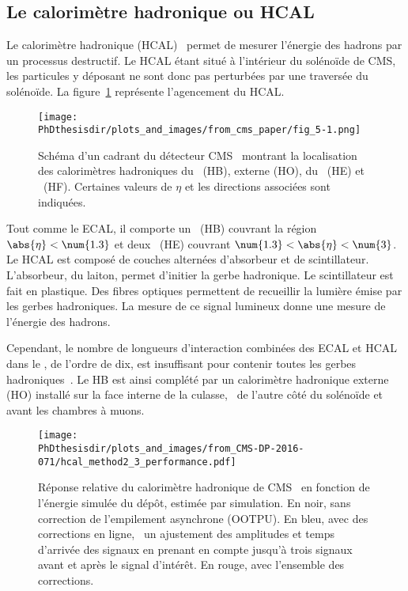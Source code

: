 \subsection{Le calorimètre hadronique ou HCAL}\label{chapter-LHC-section-CMS-subsec-HCAL}
Le calorimètre hadronique (HCAL)~\cite{cms_paper,CERN-LHCC-97-031,CMS-TDR-10} permet de mesurer l'énergie des hadrons par un processus destructif.
Le HCAL étant situé à l'intérieur du solénoïde de CMS, les particules y déposant ne sont donc pas perturbées par une traversée du solénoïde.
La figure~\ref{fig-chapter-LHC-section-CMS-subsec-HCAL-cms_paper-fig_5-1} représente l'agencement du HCAL.
\begin{figure}[b]
\centering
\texttt{[image: \\PhDthesisdir/plots\_and\_images/from\_cms\_paper/fig\_5-1.png]}
\caption[Schéma du calorimètre hadronique de CMS.]{Schéma d'un cadrant du détecteur CMS~\cite{cms_paper} montrant la localisation des calorimètres hadroniques du \CMSbarrel\ (HB), externe (HO), du \CMSendcap\ (HE) et \CMSforward\ (HF). Certaines valeurs de $\eta$ et les directions associées sont indiquées.}
\label{fig-chapter-LHC-section-CMS-subsec-HCAL-cms_paper-fig_5-1}
\end{figure}
\par Tout comme le ECAL, il comporte un \CMSbarrel\ (HB) couvrant la région $\abs{\eta}<\num{1.3}$ et deux \CMSendcaps\ (HE) couvrant $\num{1.3}<\abs{\eta}<\num{3}$.
Le HCAL est composé de couches alternées d'absorbeur et de scintillateur.
L'absorbeur, du laiton, permet d'initier la gerbe hadronique.
Le scintillateur est fait en plastique.
Des fibres optiques permettent de recueillir la lumière émise par les gerbes hadroniques.
La mesure de ce signal lumineux donne une mesure de l'énergie des hadrons.
\par Cependant, le nombre de longueurs d'interaction combinées des ECAL et HCAL dans le \CMSbarrel, de l'ordre de dix, est insuffisant pour contenir toutes les gerbes hadroniques~\cite{cms_paper}.
Le HB est ainsi complété par un calorimètre hadronique externe (HO) installé sur la face interne de la culasse, \ie\ de l'autre côté du solénoïde et avant les chambres à muons.
\begin{wrapfigure}{R}{.5\textwidth}
\centering
\texttt{[image: \\PhDthesisdir/plots\_and\_images/from\_CMS-DP-2016-071/hcal\_method2\_3\_performance.pdf]}
\caption[Réponse relative du calorimètre hadronique de CMS.]{Réponse relative du calorimètre hadronique de CMS~\cite{CMS-DP-2016-071} en fonction de l'énergie simulée du dépôt, estimée par simulation. En noir, sans correction de l'empilement asynchrone (OOTPU). En bleu, avec des corrections en ligne, \ie\ un ajustement des amplitudes et temps d'arrivée des signaux en prenant en compte jusqu'à trois signaux avant et après le signal d'intérêt. En rouge, avec l'ensemble des corrections.}
\label{fig-chapter-LHC-section-CMS-subsec-HCAL-CMS-DP-2016-071-hcal_method2_3_performance}
\end{wrapfigure}

